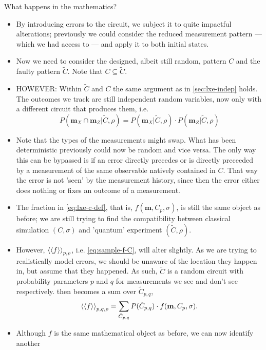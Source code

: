 \par{What happens in the mathematics?}
\begin{itemize}
  \item By introducing errors to the circuit, we subject it to quite impactful
    alterations; previously we could consider the reduced measurement
    pattern --- which we had access to --- and apply it to both initial states.
  \item Now we need to consider the designed, albeit still random, pattern $C$
    and the faulty pattern $\tilde{C}$. Note that $C\subseteq\tilde{C}$.
  \item HOWEVER: Within $\tilde{C}$ and $C$ the same argument as in
    \cref{sec:lxe-indep} holds. The outcomes we track are still independent
    random variables, now only with a different circuit that produces them,
    i.e. \[ P(\mathbf{m}_X \cap \mathbf{m}_Z | \tilde{C}, \rho) = 
    P(\mathbf{m}_X | \tilde{C}, \rho)\cdot P(\mathbf{m}_Z | \tilde{C}, \rho) \]
  \item Note that the types of the measurements might swap. What has been
    deterministic previously could now be random and vice versa. The only way
    this can be bypassed is if an error directly precedes or is directly preceeded by a
    measurement of the same observable natively contained in $C$. That way the
    error is not 'seen' by the measurement history, since then the error either
    does nothing or fixes an outcome of a measurement.
  \item The fraction in \cref{eq:lxe-c-def}, that is, $f(\mathbf{m}, C_p,
    \sigma)$, is still the same object as before;
    we are still trying to find the compatibility between classical simulation
    $(C, \sigma)$ and 'quantum' experiment $(\tilde{C}, \rho)$.
  \item However, $\expval{\expval{f}}_{p,\rho}$, i.e. \cref{eq:sample-f-C},
    will alter slightly. As we are trying to realistically model errors, we
    should be unaware of the location they happen in, but assume that they
    happened. As such, $\tilde{C}$ is a random circuit with probability
    parameters $p$ and $q$ for measurements we see and don't see respectively.
     then becomes a sum over $\tilde{C}_{p,q}$,
    \begin{align} \label{eq:sample-f-Ctilde}
      \expval{\expval{f}}_{p,q,\rho} = \sum_{\tilde{C}_{p,q}} P(\tilde{C}_{p,q})
      \cdot f(\mathbf{m},C_p, \sigma)
    .\end{align}
  \item Although $f$ is the same mathematical object as before, we can now identify another

\end{itemize}
